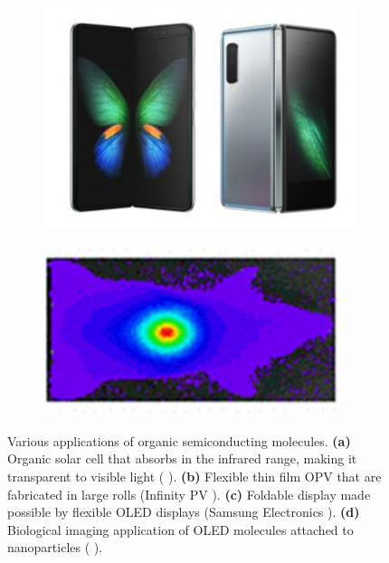 \begin{figure}[h]
    \begin{subfigure}[t]{.43\textwidth}
        \centering
        \includegraphics[width=\textwidth]{pictures/folding_oled_fold.PNG}
        \caption{}
    \end{subfigure}
    \hspace{0.5cm}
    \begin{subfigure}[t]{.43\textwidth}
        \centering
        \includegraphics[width=0.95\textwidth]{pictures/biological_oled.PNG}
        \caption{}
    \end{subfigure}
    
    
    \caption[Various applications of organic semiconducting materials. \textbf{(a)} Organic solar cell that absorbs in the infrared range, making it transparent to visible light. \textbf{(b)} Flexible thin film {OPV} that are fabricated in large rolls (Infinity PV). \textbf{(c)} Foldable display made possible by flexible {OLED} technology (Samsung Electronics). \textbf{(d)} Biological imaging application of {OLED} molecules attached to nanoparticles.]{Various applications of organic semiconducting molecules. \textbf{(a)} Organic solar cell that absorbs in the infrared range, making it transparent to visible light (\citeauthor{zhao2014near} \citep{zhao2014near}). \textbf{(b)} Flexible thin film {OPV} that are fabricated in large rolls (Infinity PV \citep{jacobyInfinityPV}). \textbf{(c)} Foldable display made possible by flexible {OLED} displays (Samsung Electronics \citep{galaxyFold}). \textbf{(d)} Biological imaging application of {OLED} molecules attached to nanoparticles (\citeauthor{crossley2017post} \citep{crossley2017post}).  }
    \label{fig:intro:applications}
\end{figure}
